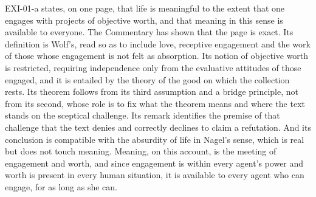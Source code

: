 EXI-01-a states, on one page, that life is meaningful to the extent that one engages with projects of objective worth, and that meaning in this sense is available to everyone. The Commentary has shown that the page is exact. Its definition is Wolf's, read so as to include love, receptive engagement and the work of those whose engagement is not felt as absorption. Its notion of objective worth is restricted, requiring independence only from the evaluative attitudes of those engaged, and it is entailed by the theory of the good on which the collection rests. Its theorem follows from its third assumption and a bridge principle, not from its second, whose role is to fix what the theorem means and where the text stands on the sceptical challenge. Its remark identifies the premise of that challenge that the text denies and correctly declines to claim a refutation. And its conclusion is compatible with the absurdity of life in Nagel's sense, which is real but does not touch meaning. Meaning, on this account, is the meeting of engagement and worth, and since engagement is within every agent's power and worth is present in every human situation, it is available to every agent who can engage, for as long as she can.
